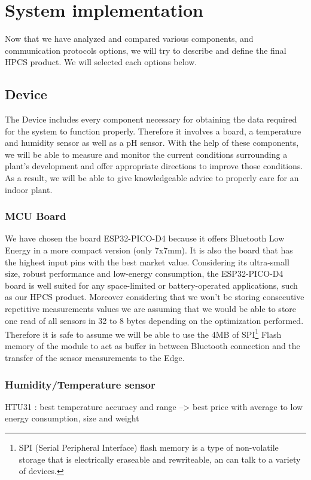 \section{System implementation}
Now that we have analyzed and compared various components, and communication protocols options, we will try to describe and define the final HPCS product. We will selected each options below.
\subsection{Device}
The Device includes every component necessary for obtaining the data required for the system to function properly.
Therefore it involves a board, a temperature and humidity sensor as well as a pH sensor. With the help of these components, we will be able to measure and monitor the current conditions surrounding a plant's development and offer appropriate directions to improve those conditions. As a result, we will be able to give knowledgeable advice to properly care for an indoor plant.
\subsubsection{MCU Board}
We have chosen the board ESP32-PICO-D4 because it offers Bluetooth Low Energy in a more compact version (only 7x7mm). It is also the board that has the highest input pins with the best market value.
Considering its ultra-small size, robust performance and low-energy consumption, the ESP32-PICO-D4 board is well suited for any space-limited or battery-operated applications, such as our HPCS product.
Moreover considering that we won't be storing consecutive repetitive measurements values we are assuming that we would be able to store one read of all sensors in 32 to 8 bytes depending on the optimization performed. Therefore it is safe to assume we will be able to use the 4MB of SPI\footnote{SPI (Serial Peripheral Interface) flash memory is a type of non-volatile storage that is electrically eraseable and rewriteable, an can talk to a variety of devices.} Flash memory of the module to act as buffer in between Bluetooth connection and the transfer of the sensor measurements to the Edge.

\subsubsection{Humidity/Temperature sensor}
HTU31 : best temperature accuracy and range --> best price with average to low energy consumption, size and weight 
